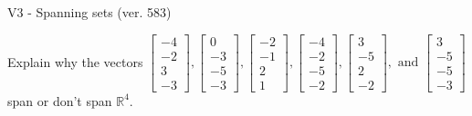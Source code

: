 \begin{exercise}
  \begin{exerciseTitle}V3 - Spanning sets (ver. 583)\end{exerciseTitle}
  \begin{exerciseStatement}
    Explain why the vectors \(\left[\begin{array}{r}
-4 \\
-2 \\
3 \\
-3
\end{array}\right] , \left[\begin{array}{r}
0 \\
-3 \\
-5 \\
-3
\end{array}\right] , \left[\begin{array}{r}
-2 \\
-1 \\
2 \\
1
\end{array}\right] , \left[\begin{array}{r}
-4 \\
-2 \\
-5 \\
-2
\end{array}\right] , \left[\begin{array}{r}
3 \\
-5 \\
2 \\
-2
\end{array}\right] , \text{ and } \left[\begin{array}{r}
3 \\
-5 \\
-5 \\
-3
\end{array}\right]\) span or don't span \(\mathbb{R}^4\). 
	



\end{exerciseStatement}
\end{exercise}

